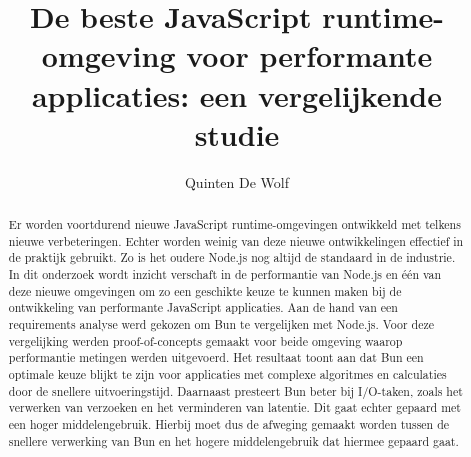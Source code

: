\documentclass[a0,portrait]{hogent-poster}
\title{De beste JavaScript runtime-omgeving voor performante applicaties: een vergelijkende studie}
\author{Quinten De Wolf}
\begin{document}
\maketitle

\begin{abstract}
Er worden voortdurend nieuwe JavaScript runtime-omgevingen ontwikkeld met telkens nieuwe verbeteringen. 
Echter worden weinig van deze nieuwe ontwikkelingen effectief in de praktijk gebruikt.
Zo is het oudere Node.js nog altijd de standaard in de industrie. 
In dit onderzoek wordt inzicht verschaft in de performantie van Node.js en één van deze nieuwe omgevingen 
om zo een geschikte keuze te kunnen maken bij de ontwikkeling van performante JavaScript applicaties.
Aan de hand van een requirements analyse werd gekozen om Bun te vergelijken met Node.js.
Voor deze vergelijking werden proof-of-concepts gemaakt voor beide omgeving waarop performantie metingen werden uitgevoerd.
Het resultaat toont aan dat Bun een optimale keuze blijkt te zijn voor applicaties met complexe algoritmes en calculaties door de snellere uitvoeringstijd.
Daarnaast presteert Bun beter bij I/O-taken, zoals het verwerken van verzoeken en het verminderen van latentie. Dit gaat echter gepaard met een hoger middelengebruik.
Hierbij moet dus de afweging gemaakt worden tussen de snellere verwerking van Bun en het hogere middelengebruik dat hiermee gepaard gaat.
\end{abstract}
\end{document}
